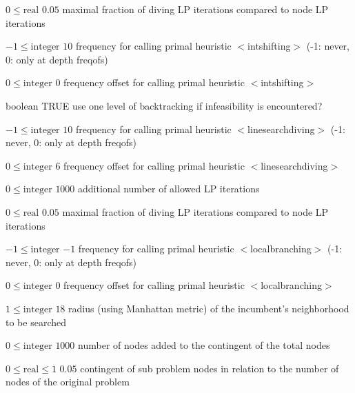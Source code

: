 %
{$0\leq\textrm{real}$}%
{$0.05$}%
{maximal fraction of diving LP iterations compared to node LP iterations}%
{}

%
{$-1\leq\textrm{integer}$}%
{$10$}%
{frequency for calling primal heuristic $<$intshifting$>$ (-1: never, 0: only at depth freqofs)}%
{}

%
{$0\leq\textrm{integer}$}%
{$0$}%
{frequency offset for calling primal heuristic $<$intshifting$>$}%
{}

%
{boolean}%
{TRUE}%
{use one level of backtracking if infeasibility is encountered?}%
{}

%
{$-1\leq\textrm{integer}$}%
{$10$}%
{frequency for calling primal heuristic $<$linesearchdiving$>$ (-1: never, 0: only at depth freqofs)}%
{}

%
{$0\leq\textrm{integer}$}%
{$6$}%
{frequency offset for calling primal heuristic $<$linesearchdiving$>$}%
{}

%
{$0\leq\textrm{integer}$}%
{$1000$}%
{additional number of allowed LP iterations}%
{}

%
{$0\leq\textrm{real}$}%
{$0.05$}%
{maximal fraction of diving LP iterations compared to node LP iterations}%
{}

%
{$-1\leq\textrm{integer}$}%
{$-1$}%
{frequency for calling primal heuristic $<$localbranching$>$ (-1: never, 0: only at depth freqofs)}%
{}

%
{$0\leq\textrm{integer}$}%
{$0$}%
{frequency offset for calling primal heuristic $<$localbranching$>$}%
{}

%
{$1\leq\textrm{integer}$}%
{$18$}%
{radius (using Manhattan metric) of the incumbent's neighborhood to be searched}%
{}

%
{$0\leq\textrm{integer}$}%
{$1000$}%
{number of nodes added to the contingent of the total nodes}%
{}

%
{$0\leq\textrm{real}\leq1$}%
{$0.05$}%
{contingent of sub problem nodes in relation to the number of nodes of the original problem}%
{}

